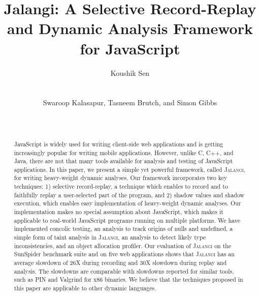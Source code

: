 \documentclass{sig-alternate}
\def\jalangi{\textsc{Jalangi}}
\begin{document}

\title{Jalangi: A Selective Record-Replay and Dynamic Analysis
  Framework for JavaScript} 

\author{
\alignauthor
Koushik Sen\\
      \\
      \\
\alignauthor
Swaroop Kalasapur, Tasneem Brutch, and Simon Gibbs\\
\\
\\
}
\maketitle
\sloppy

\begin{abstract}
  JavaScript is widely used for writing client-side web applications
  and is getting increasingly popular for writing mobile applications.
  However, unlike C, C++, and Java, there are not that many tools
  available for analysis and testing of JavaScript applications.  In
  this paper, we present a simple yet powerful framework, called
  \jalangi{}, for writing heavy-weight dynamic analyses.  Our
  framework incorporates two key techniques: 1) selective
  record-replay, a technique which enables to record and to faithfully
  replay a user-selected part of the program, and 2) shadow values and
  shadow execution, which enables easy implementation of heavy-weight
  dynamic analyses.  Our implementation makes no special assumption
  about JavaScript, which makes it applicable to real-world JavaScript
  programs running on multiple platforms.  We have implemented
  concolic testing, an analysis to track origins of nulls and
  undefined, a simple form of taint analysis in \jalangi{}, an
  analysis to detect likely type inconsistencies, and an object
  allocation profiler.  Our evaluation of \jalangi{} on the SunSpider
  benchmark suite and on five web applications shows that \jalangi{}
  has an average slowdown of 26X during recording and 30X slowdown
  during replay and analysis.  The slowdowns are comparable with
  slowdowns reported for similar tools, such as PIN and Valgrind for
  x86 binaries.  We believe that the techniques proposed in this paper
  are applicable to other dynamic languages.
\end{abstract}
\end{document}
